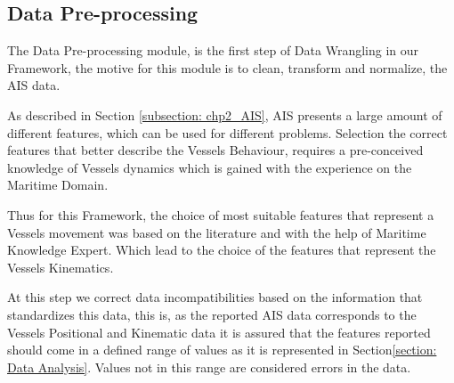 

\subsection{Data Pre-processing}
The Data Pre-processing module, is the first step of Data Wrangling in our Framework, the motive for this module is to clean, transform and normalize, the AIS data.

As described in Section \ref{subsection: chp2_AIS},  AIS presents a large amount of different features, which can be used for different problems. Selection the correct features that better describe the Vessels Behaviour,  requires a pre-conceived knowledge of Vessels dynamics which is gained with the experience on the Maritime Domain. 


Thus for this Framework, the choice of most suitable features that represent a Vessels movement was based on the literature and with the help of Maritime Knowledge Expert. Which lead to the choice of the features that represent the Vessels Kinematics.

At this step we correct data incompatibilities based on the information that standardizes this data, this is, as the reported AIS data corresponds to the Vessels Positional and Kinematic data it is assured that the features reported should come in a defined range of values as it is represented in Section\ref{section: Data Analysis}. Values not in this range are considered errors in the data. 

